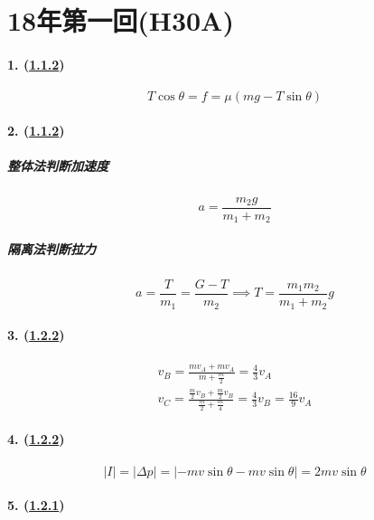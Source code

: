 
\section{18年第一回(H30A)}

\paragraph{1. (\hyperref[subsec:1.1.2]{1.1.2})}

\begin{equation*}
    T\cos\theta=f=\mu(mg-T\sin\theta)
\end{equation*}

\paragraph{2. (\hyperref[subsec:1.1.2]{1.1.2})}

\subparagraph{整体法判断加速度}

\begin{equation*}
    a=\frac{m_2g}{m_1+m_2}
\end{equation*}

\subparagraph{隔离法判断拉力}

\begin{equation*}
    a=\frac{T}{m_1}=\frac{G-T}{m_2}\implies
    T=\frac{m_1m_2}{m_1+m_2}g
\end{equation*}

\paragraph{3. (\hyperref[subsec:1.2.2]{1.2.2})}

\begin{gather*}
    v_B=\frac{mv_A+mv_A}{m+\frac{m}{2}}=\frac43v_A\\
    v_C=\frac{\frac{m}{2}v_B+\frac{m}{2}v_B}{\frac{m}{2}+\frac{m}{4}}=\frac43v_B=\frac{16}{9}v_A
\end{gather*}

\paragraph{4. (\hyperref[subsec:1.2.2]{1.2.2})}

\begin{equation*}
    |I|=|\Delta p|=|-mv\sin\theta-mv\sin\theta|=2mv\sin\theta
\end{equation*}

\paragraph{5. (\hyperref[subsec:1.2.1]{1.2.1})}

